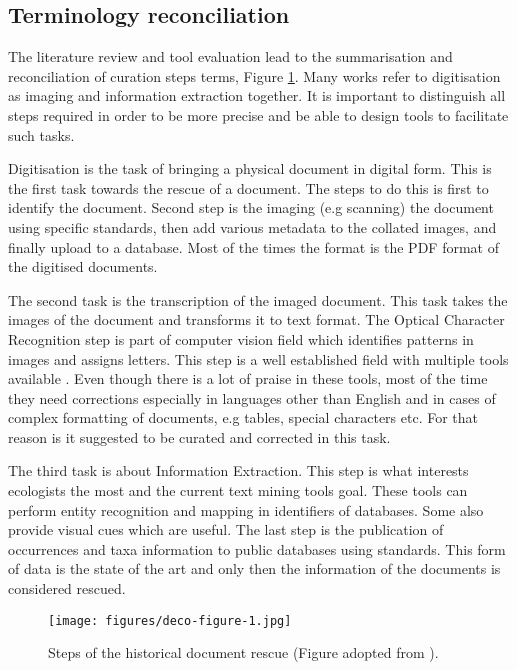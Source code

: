\subsection{Terminology reconciliation}

The literature review and tool evaluation lead to the summarisation and 
reconciliation of curation steps terms, Figure \ref{fig:rescue-workflow}. 
Many works refer to digitisation as imaging and information extraction together. 
It is important to distinguish all steps required in order to be more precise 
and be able to design tools to facilitate such tasks.

Digitisation is the task of bringing a physical document in digital form. 
This is the first task towards the rescue of a document. The steps to 
do this is first to identify the document. Second step is the imaging (e.g scanning)
the document using specific standards, then add various metadata to the collated images,
and finally upload to a database. Most of the times the format is the PDF format of 
the digitised documents.

The second task is the transcription of the imaged document. This task
takes the images of the document and transforms it to text format. The
Optical Character Recognition step is part of computer vision field
which identifies patterns in images and assigns letters. This step is 
a well established field with multiple tools available \parencite{Paragkamian2022}.
Even though there is a lot of praise in these tools, most of the time they 
need corrections especially in languages other than English and in cases of 
complex formatting of documents, e.g tables, special characters etc. For that 
reason is it suggested to be curated and corrected in this task.

The third task is about Information Extraction. This step is what interests 
ecologists the most and the current text mining tools goal. These tools can perform
entity recognition and mapping in identifiers of databases. Some also provide visual 
cues which are useful. The last step is the publication of occurrences and taxa
information to public databases using standards. This form of data is the state of 
the art and only then the information of the documents is considered rescued.

   \begin{figure}[htp!]
      \centering
      \texttt{[image: figures/deco-figure-1.jpg]}
      \caption[Historical document rescue process]{Steps of the historical document rescue (Figure adopted from \parencite{Paragkamian2022}).}
      \label{fig:rescue-workflow}
   \end{figure}

